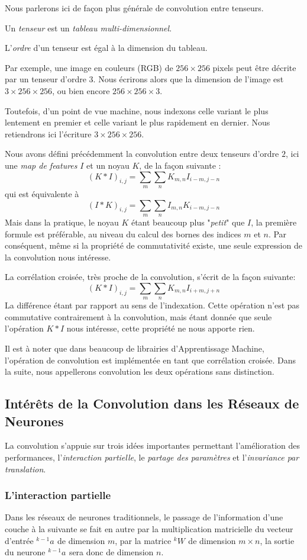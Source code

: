 \documentclass[a4paper, 10pt]{report}
\newcommand{\lexp}[1]{\phantom{}^{#1}}
\newcommand{\elem}[4]{\lexp{#2}#1^{#3}_{#4}}
\begin{document}
Nous parlerons ici de façon plus générale de convolution entre tenseurs.
\begin{center}
	Un \emph{tenseur} est un \emph{tableau multi-dimensionnel}.
	
	L'\emph{ordre} d'un tenseur est égal à la dimension du tableau.
\end{center}
Par exemple, une image en couleurs (RGB) de $256 \times 256$ pixels peut être décrite par un tenseur d'ordre $3$.
Nous écrirons alors que la dimension de l'image est $3 \times 256 \times 256$, ou bien encore $256 \times 256 \times 3$.

Toutefois, d'un point de vue machine, nous indexons celle variant le plus lentement en premier et celle variant le plus rapidement en dernier. Nous retiendrons ici l'écriture $3 \times 256 \times 256$.

Nous avons défini précédemment la convolution entre deux tenseurs d'ordre $2$, ici une \emph{map de features} $I$ et un noyau $K$, de la façon suivante :
$$(K*I)_{i,j} = \sum_{m}\sum_{n}{K_{m,n}I_{i-m,j-n}}$$
qui est équivalente à 
$$(I*K)_{i,j} = \sum_{m}\sum_{n}{I_{m,n}K_{i-m,j-n}}$$
Mais dans la pratique, le noyau $K$ étant beaucoup plus "\emph{petit}" que $I$, la première formule est préférable, au niveau du calcul des bornes des indices $m$ et $n$.
Par conséquent, même si la propriété de commutativité existe, une seule expression de la convolution nous intéresse.

La corrélation croisée, très proche de la convolution, s'écrit de la façon suivante:
$$(K*I)_{i,j} = \sum_{m}\sum_{n}{K_{m,n}I_{i+m,j+n}}$$
La différence étant par rapport au sens de l'indexation. Cette opération n'est pas commutative contrairement à la convolution, mais étant donnée que seule l'opération $K*I$ nous intéresse, cette propriété ne nous apporte rien.

Il est à noter que dans beaucoup de librairies d'Apprentissage Machine, l'opération de convolution est implémentée en tant que corrélation croisée. Dans la suite, nous appellerons convolution les deux opérations sans distinction.
			
\subsection{Intérêts de la Convolution dans les Réseaux de Neurones}
La convolution s'appuie sur trois idées importantes permettant l'amélioration des performances, l'\emph{interaction partielle}, le \emph{partage des paramètres} et l'\emph{invariance par translation}.
\subsubsection{L'interaction partielle}
Dans les réseaux de neurones traditionnels, le passage de l'information d'une couche à la suivante se fait en autre par la multiplication matricielle du vecteur d'entrée $\elem{a}{k-1}{}{}$ de dimension $m$, par la matrice $\elem{W}{k}{}{}$ de dimension $m \times n$, la sortie du neurone $\elem{a}{k-1}{}{}$ sera donc de dimension $n$.
\end{document}
